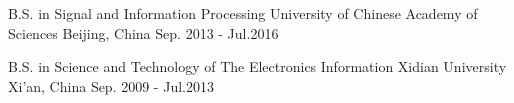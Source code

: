 

\begin{cventries}

  \cventry
    {B.S. in Signal and Information Processing} %
    {University of Chinese Academy of Sciences} %
    {Beijing, China} %
    {Sep. 2013 - Jul.2016} %
    {
    }

  \cventry
    {B.S. in Science and Technology of The Electronics Information} %
    {Xidian University} %
    {Xi'an, China} %
    {Sep. 2009 - Jul.2013} %
    {
    }

\end{cventries}
